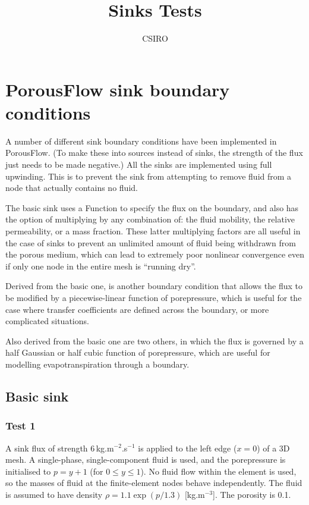 \documentclass[]{scrreprt}
\begin{document}
\title{Sinks Tests}
\author{CSIRO}
\maketitle

\tableofcontents

\chapter{PorousFlow sink boundary conditions}

A number of different sink boundary conditions have been implemented
in PorousFlow.  (To make these into sources instead of sinks, the
strength of the flux just needs to be made negative.)  All the sinks
are implemented using full upwinding.  This is to prevent the sink
from attempting to remove fluid from a node that actually contains no
fluid.

The basic sink uses a Function to specify the flux on the boundary,
and also has the option of multiplying by any combination of: the
fluid mobility, the relative permeability, or a mass fraction.  These
latter multiplying factors are all useful in the case of sinks to
prevent an unlimited amount of fluid being withdrawn from the porous
medium, which can lead to extremely poor nonlinear convergence even if
only one node in the entire mesh is ``running dry''.

Derived from the basic one, is another boundary condition that allows
the flux to be modified by a piecewise-linear function of
porepressure, which is useful for the case where transfer coefficients
are defined across the boundary, or more complicated situations.

Also derived from the basic one are two others, in which the flux is
governed by a half Gaussian or half cubic function of porepressure,
which are useful for modelling evapotranspiration through a boundary.

\section{Basic sink}
\label{basic.sec}

\subsection{Test 1}

A sink flux of strength 6\,kg.m$^{-2}$.s$^{-1}$ is applied to the left
edge ($x=0$) of a 3D mesh.  A single-phase, single-component fluid is
used, and the porepressure is initialised to $p=y+1$ (for $0\leq y\leq
1$).  No fluid flow within the element is used, so the masses of fluid
at the finite-element nodes behave independently.  The fluid is
assumed to have density $\rho = 1.1 \exp(p/1.3)$ [kg.m$^{-3}$].  The
porosity is 0.1.
\end{document}
